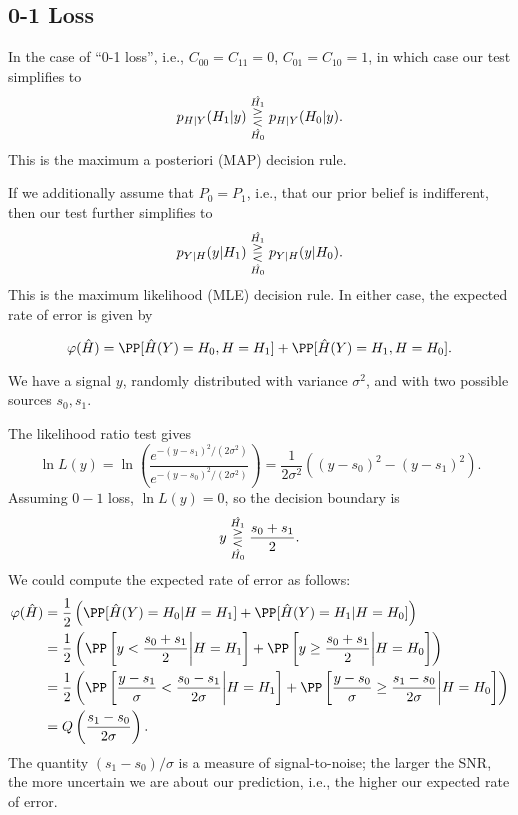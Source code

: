 \subsection{0-1 Loss}

In the case of ``0-1 loss'', i.e., $C_{00} = C_{11} = 0$, $C_{01} = C_{10} = 1$, in which case our test simplifies to 
\[p_{H|Y}(H_1|y) \overunderset{\hat{H_1}}{\hat{H_0}}{\gtreqless} p_{H|Y}(H_0|y).\]
This is the \ac{maximum a posteriori} (MAP) decision rule.

If we additionally assume that $P_0=P_1$, i.e., that our prior belief is indifferent, then our test further simplifies to 
\[p_{Y|H}(y|H_1) \overunderset{\hat{H_1}}{\hat{H_0}}{\gtreqless} p_{Y|H}(y|H_0).\] 
This is the \ac{maximum likelihood} (MLE) decision rule. In either case, the expected rate of error is given by 

\[\varphi(\hat{H}) = \PP[\hat{H}(Y) = H_0, H = H_1] + \PP[\hat{H}(Y) = H_1, H = H_0].\]

\begin{example}

We have a signal $y$, randomly distributed with variance $\sigma^2$, and with two possible sources $s_0,s_1$.
\end{example}

The likelihood ratio test gives 
\[\ln{L(y)} = \ln\left(\frac{e^{-(y-s_1)^2/(2\sigma^2)}}{e^{-(y-s_0)^2/(2\sigma^2)}}\right) = \frac{1}{2\sigma^2}((y-s_0)^2 - (y-s_1)^2).\] 
Assuming $0-1$ loss, $\ln{L(y)}=0$, so the decision boundary is 
\[y\overunderset{\hat{H_1}}{\hat{H_0}}{\gtreqless}\frac{s_0+s_1}{2}.\]
We could compute the expected rate of error as follows: 
\begin{align*}
	\varphi(\hat{H}) &= \frac{1}{2}\left(\PP[\hat{H}(Y)=H_0|H=H_1] + \PP[\hat{H}(Y)=H_1|H=H_0]\right) \\
									 &= \frac{1}{2}\left(\PP\left[y < \frac{s_0+s_1}{2}\bigg|H=H_1\right] + \PP\left[y \geq \frac{s_0+s_1}{2}\bigg|H=H_0\right]\right) \\
									 &= \frac{1}{2}\left(\PP\left[\frac{y-s_1}{\sigma} < \frac{s_0-s_1}{2\sigma}\bigg|H=H_1\right] + \PP\left[\frac{y-s_0}{\sigma} \geq \frac{s_1-s_0}{2\sigma}\bigg|H=H_0\right]\right) \\
									 &= Q\left(\frac{s_1-s_0}{2\sigma}\right).
\end{align*}
The quantity $(s_1-s_0)/\sigma$ is a measure of signal-to-noise; the larger the SNR, the more uncertain we are about our prediction, i.e., the higher our expected rate of error. 


